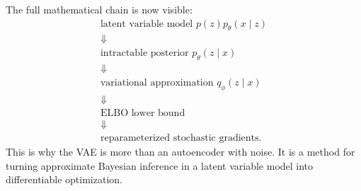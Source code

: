 The full mathematical chain is now visible:
\[
\begin{array}{c}
\text{latent variable model }p(z)p_\theta(x\mid z)\\
\Downarrow\\
\text{intractable posterior }p_\theta(z\mid x)\\
\Downarrow\\
\text{variational approximation }q_\phi(z\mid x)\\
\Downarrow\\
\text{ELBO lower bound}\\
\Downarrow\\
\text{reparameterized stochastic gradients.}
\end{array}
\]
This is why the VAE is more than an autoencoder with noise.  It is a method for turning approximate Bayesian inference in a latent variable model into differentiable optimization.
